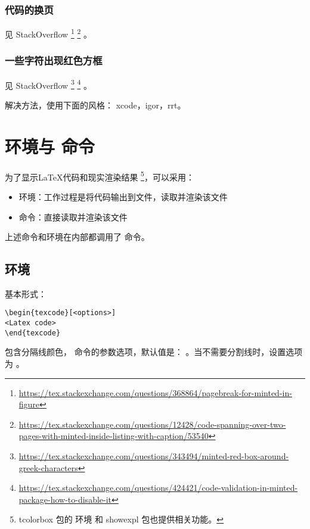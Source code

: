 \subsubsection{代码的换页}

见 StackOverflow
\footnote{\url{https://tex.stackexchange.com/questions/368864/pagebreak-for-minted-in-figure}}
\footnote{\url{https://tex.stackexchange.com/questions/12428/code-spanning-over-two-pages-with-minted-inside-listing-with-caption/53540}}
。

\subsubsection{一些字符出现红色方框}

见 StackOverflow
\footnote{\url{https://tex.stackexchange.com/questions/343494/minted-red-box-around-greek-characters}}
\footnote{\url{https://tex.stackexchange.com/questions/424421/code-validation-in-minted-package-how-to-disable-it}}
。

解决方法，使用下面的风格：
xcode，igor，rrt。

\section{\protect{} 环境与 \protect{} 命令}

为了显示{\LaTeX}代码和现实渲染结果
\footnote{tcolorbox 包的  环境 和 showexpl 包也提供相关功能。}，可以采用：
\begin{itemize}
  \item {} 环境：工作过程是将代码输出到文件，读取并渲染该文件
  \item {} 命令：直接读取并渲染该文件
\end{itemize}

上述命令和环境在内部都调用了  命令。

\subsection{\protect{} 环境}

基本形式：

\begin{verbatim}
\begin{texcode}[<options>]
<Latex code>
\end{texcode}
\end{verbatim}

 包含分隔线颜色， 命令的参数选项，默认值是：
\verbum{[color=teal, mint=\{\}]}。当不需要分割线时，设置选项为 \verbum{[color=\{\}]}。


